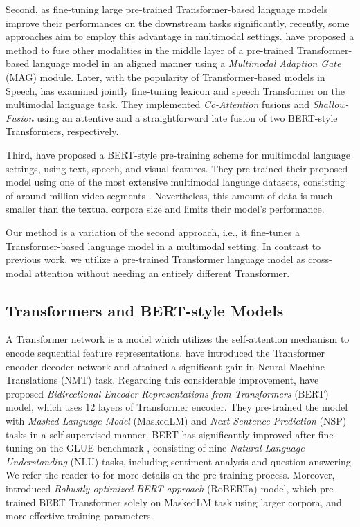 \documentclass[letterpaper]{article} \usepackage{spconf,amsmath,graphicx}
\begin{document}
Second, as fine-tuning large pre-trained Transformer-based language models improve their performances on the downstream tasks significantly, recently, some approaches aim to employ this advantage in multimodal settings. \cite{rahman2020integrating} have proposed a method to fuse other modalities in the middle layer of a pre-trained Transformer-based language model in an aligned manner using a \textit{Multimodal Adaption Gate} (MAG) module. Later, with the popularity of Transformer-based models in Speech, \cite{siriwardhana2020jointly} has examined jointly fine-tuning lexicon and speech Transformer on the multimodal language task. They implemented \textit{Co-Attention} fusions and \textit{Shallow-Fusion} using an attentive and a straightforward late fusion of two BERT-style \cite{devlin2018bert} Transformers, respectively. 

Third, \cite{khare2021self} have proposed a BERT-style pre-training scheme for multimodal language settings, using text, speech, and visual features. They pre-trained their proposed model using one of the most extensive multimodal language datasets, consisting of around  million video segments \cite{chung2018voxceleb2}. Nevertheless, this amount of data is much smaller than the textual corpora size and limits their model's performance.

Our method is a variation of the second approach, i.e., it fine-tunes a Transformer-based language model in a multimodal setting. In contrast to previous work, we utilize a pre-trained Transformer language model as cross-modal attention without needing an entirely different Transformer.

\subsection{Transformers and BERT-style Models}

A Transformer network is a model which utilizes the self-attention mechanism to encode sequential feature representations.
\cite{vaswani2017attention} have introduced the Transformer encoder-decoder network and attained a significant gain in Neural Machine Translations (NMT) task. Regarding this considerable improvement, \cite{devlin2018bert} have proposed \textit{Bidirectional Encoder Representations from Transformers} (BERT) model, which uses 12 layers of Transformer encoder. They pre-trained the model with \textit{Masked Language Model} (MaskedLM)  and \textit{Next Sentence Prediction} (NSP) tasks in a self-supervised manner. BERT has significantly improved after fine-tuning on the GLUE benchmark \cite{wang2018glue}, consisting of nine \textit{Natural Language Understanding} (NLU) tasks, including sentiment analysis and question answering. We refer the reader to \cite{devlin2018bert} for more details on the pre-training process. Moreover, \cite{liu2019roberta} introduced \textit{Robustly optimized BERT approach} (RoBERTa) model, which pre-trained BERT Transformer solely on MaskedLM task using larger corpora, and more effective training parameters. 
\end{document}
